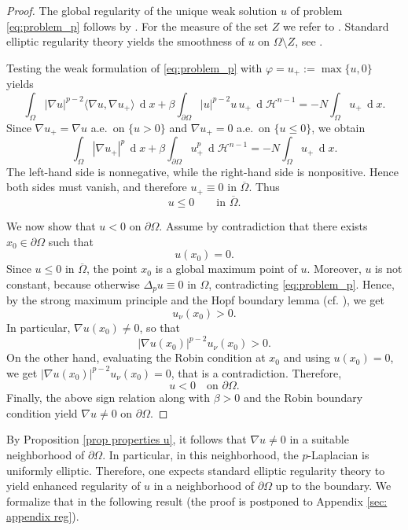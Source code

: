 \documentclass[10pt,a4paper]{amsart}
\numberwithin{equation}{section}
\renewcommand{\d}[1]{\ensuremath{\operatorname{d}\!{#1}}}
\begin{document}
\begin{proof}
The global regularity of the unique weak solution $u$ of problem \eqref{eq:problem_p} follows by \cite[Theorem 2]{Lieberman88}. For the measure of the set $Z$ we refer to \cite[Corollary 1.1]{Lou2008}. Standard elliptic regularity theory yields the smoothness of $u$ on $\Omega \setminus Z$, see \cite[Lemma 3.1]{fgk}.

Testing the weak formulation of \eqref{eq:problem_p} with $\varphi= u_+ := \max\{u,0\}$ yields
\[
\int_\Omega |\nabla u|^{p-2} \langle\nabla u,  \nabla u_+ \rangle\,\d{x}
+\beta\int_{\partial\Omega}|u|^{p-2}u\,u_+\,\d{\mathcal H^{n-1}}
=-N\int_\Omega u_+\,\d{x}.
\]
Since $\nabla u_+=\nabla u$ a.e.\ on $\{u>0\}$ and $\nabla u_+=0$ a.e.\ on $\{u\le 0\}$, we obtain
\[
\int_\Omega |\nabla u_+|^p\,\d{x}
+\beta\int_{\partial\Omega}u_+^p\,\d{\mathcal H^{n-1}}
=-N\int_\Omega u_+\,\d{x}.
\]
The left-hand side is nonnegative, while the right-hand side is nonpositive. Hence both sides must vanish, and therefore $u_+\equiv 0$ in $\overline{\Omega}$.
Thus
\[
u\le 0 \qquad \text{in }\overline{\Omega}.
\]

We now show that $u<0$ on $\partial\Omega$. Assume by contradiction that there exists $x_0\in\partial\Omega$ such that
\[
u(x_0)=0.
\]
Since $u\le 0$ in $\overline{\Omega}$, the point $x_0$ is a global maximum point of $u$. Moreover, $u$ is not constant, because otherwise $\Delta_p u\equiv 0$ in $\Omega$, 
contradicting \eqref{eq:problem_p}. Hence, by the strong maximum principle and the Hopf boundary lemma (cf. \cite[Chapter 5]{PucciSerrin07}), we get
\[
u_\nu(x_0) > 0.
\]
In particular, $\nabla u(x_0)\neq 0$, so that
\[
|\nabla u(x_0)|^{p-2} u_\nu(x_0)>0.
\]
On the other hand, evaluating the Robin condition at $x_0$ and using $u(x_0)=0$, we get $|\nabla u(x_0)|^{p-2} u_\nu(x_0)=0$, that is a contradiction. Therefore,
\[
u<0 \quad \text{on }\partial\Omega.
\]
Finally, the above sign relation along with $\beta >0$ and the Robin boundary condition yield $\nabla u \neq 0$ on $\partial\Omega$.
\end{proof}

By Proposition \ref{prop properties u}, it follows that $\nabla u \neq 0$ in a suitable neighborhood of $\partial\Omega$. In particular, in this neighborhood, the $p$-Laplacian is uniformly elliptic. Therefore, one expects standard elliptic regularity theory to yield enhanced regularity of $u$ in a neighborhood of $\partial\Omega$ up to the boundary. We formalize that in the following result (the proof is postponed to Appendix \ref{sec: appendix reg}). 
\end{document}
